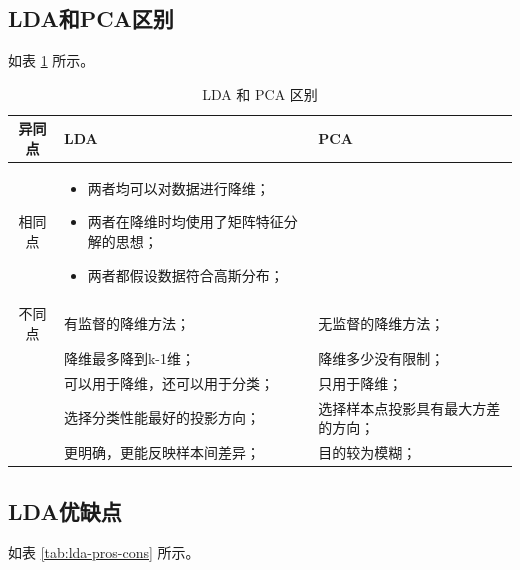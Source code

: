 \subsection{LDA和PCA区别}

如表 \ref{tab:lda-diff-pca} 所示。

\begin{table}[h]
	\centering
	\begin{tabular}{|c|p{}|p{}|}\hline
		异同点 & LDA & PCA \\\hline
		相同点 &
			\begin{itemize}
					\itemsep-.5em
					\item 两者均可以对数据进行降维；
					\item 两者在降维时均使用了矩阵特征分解的思想；
					\item 两者都假设数据符合高斯分布；
			\end{itemize} & \\\hline

不同点 & 有监督的降维方法；& 无监督的降维方法； \\
       & 降维最多降到k-1维；& 降维多少没有限制；\\
			 & 可以用于降维，还可以用于分类；& 只用于降维； \\
			 & 选择分类性能最好的投影方向；& 选择样本点投影具有最大方差的方向；\\
			 & 更明确，更能反映样本间差异；& 目的较为模糊； \\\hline
	\end{tabular}

	\caption{LDA 和 PCA 区别}
	\label{tab:lda-diff-pca}
\end{table}

\subsection{LDA优缺点}

如表 \ref{tab:lda-pros-cons} 所示。

